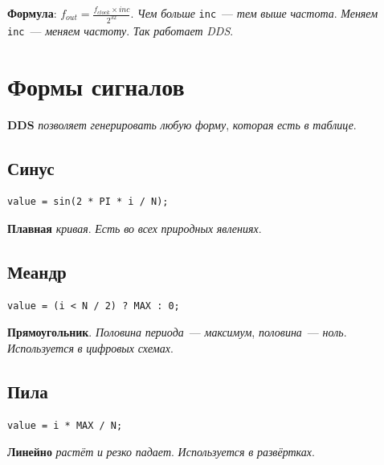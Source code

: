 \begin{keybox}
\textbf{Формула}: \(f_{out} = \frac{f_{clock} \times inc}{2^{32}}\).
\emph{Чем} \emph{больше} \texttt{inc}~--- \emph{тем}
\emph{выше} \emph{частота}. \emph{Меняем} \texttt{inc}~---
\emph{меняем} \emph{частоту}. \emph{Так} \emph{работает}
\emph{DDS}.
\end{keybox}

\section{Формы сигналов}
\label{sec:dds-waves}

\textbf{DDS} \emph{позволяет} \emph{генерировать} \emph{любую}
\emph{форму}, \emph{которая} \emph{есть} \emph{в} \emph{таблице}.

\subsection{Синус}

\begin{verbatim}
value = sin(2 * PI * i / N);
\end{verbatim}

\textbf{Плавная} \emph{кривая}. \emph{Есть} \emph{во} \emph{всех}
\emph{природных} \emph{явлениях}.

\subsection{Меандр}

\begin{verbatim}
value = (i < N / 2) ? MAX : 0;
\end{verbatim}

\textbf{Прямоугольник}. \emph{Половина} \emph{периода}~---
\emph{максимум}, \emph{половина}~--- \emph{ноль}.
\emph{Используется} \emph{в} \emph{цифровых} \emph{схемах}.

\subsection{Пила}

\begin{verbatim}
value = i * MAX / N;
\end{verbatim}

\textbf{Линейно} \emph{растёт} \emph{и} \emph{резко} \emph{падает}.
\emph{Используется} \emph{в} \emph{развёртках}.

